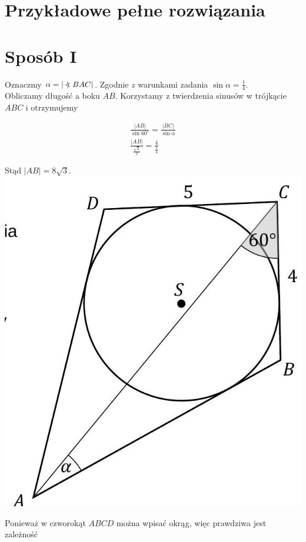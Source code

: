 \documentclass[10pt]{article}
\newcommand\Varangle{\mathop{{<\!\!\!\!\!\text{\small)}}\:}\nolimits}
\begin{document}
\section*{Przykładowe pełne rozwiązania}
\section*{Sposób I}
Oznaczmy $\alpha=|\Varangle B A C|$. Zgodnie $z$ warunkami zadania $\sin \alpha=\frac{1}{4}$.\\
Obliczamy długość a boku $A B$. Korzystamy z twierdzenia sinusów w trójkącie $A B C$ i otrzymujemy

$$
\begin{gathered}
\frac{|A B|}{\sin 60^{\circ}}=\frac{|B C|}{\sin \alpha} \\
\frac{|A B|}{\frac{\sqrt{3}}{2}}=\frac{4}{\frac{1}{4}}
\end{gathered}
$$

Stąd $|A B|=8 \sqrt{3}$.\\
\includegraphics[max width=\textwidth, center]{2025_02_07_dcb3d059df06a3930b0ag-30}

Ponieważ w czworokąt $A B C D$ można wpisać okrąg, więc prawdziwa jest zależność
\end{document}
